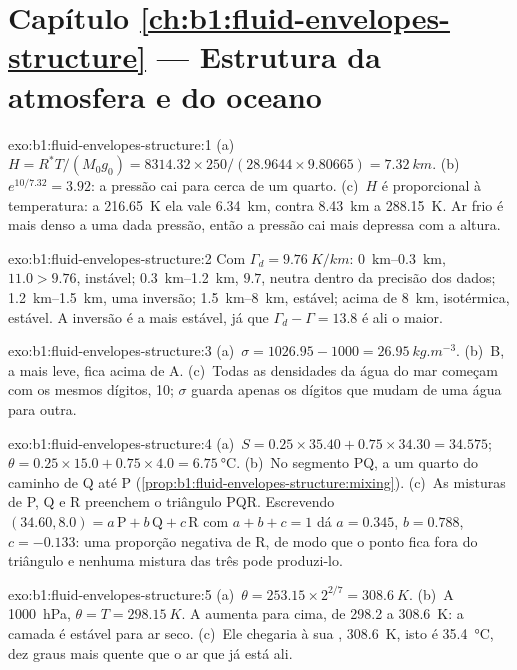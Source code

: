 \section*{Capítulo \ref{ch:b1:fluid-envelopes-structure} --- Estrutura da atmosfera e do oceano}

\begin{solution}{exo:b1:fluid-envelopes-structure:1}
(a)~$H = R^*T/(M_0 g_0) = 8314.32 \times 250/(28.9644 \times 9.80665) =
\qty{7.32}{km}$. (b)~$e^{10/7.32} = 3.92$: a pressão cai para cerca de um quarto.
(c)~$H$ é proporcional à temperatura: a \qty{216.65}{K} ela vale
\qty{6.34}{km}, contra \qty{8.43}{km} a \qty{288.15}{K}. Ar frio é mais denso a uma
dada pressão, então a pressão cai mais depressa com a altura.
\end{solution}

\begin{solution}{exo:b1:fluid-envelopes-structure:2}
Com $\Gamma_d = \qty{9.76}{K/km}$: \qtyrange{0}{0.3}{km}, $11.0 > 9.76$,
instável; \qtyrange{0.3}{1.2}{km}, $9.7$, neutra dentro da precisão dos dados;
\qtyrange{1.2}{1.5}{km}, uma inversão; \qtyrange{1.5}{8}{km}, estável; acima de \qty{8}{km},
isotérmica, estável. A inversão é a mais estável, já que $\Gamma_d - \Gamma = 13.8$ é ali o maior.
\end{solution}

\begin{solution}{exo:b1:fluid-envelopes-structure:3}
(a)~$\sigma = 1026.95 - 1000 = \qty{26.95}{kg.m^{-3}}$. (b)~B, a mais leve, fica acima de A.
(c)~Todas as densidades da água do mar começam com os mesmos dígitos, 10; $\sigma$ guarda apenas
os dígitos que mudam de uma água para outra.
\end{solution}

\begin{solution}{exo:b1:fluid-envelopes-structure:4}
(a)~$S = 0.25 \times 35.40 + 0.75 \times 34.30 = 34.575$; $\theta = 0.25 \times
15.0 + 0.75 \times 4.0 = \qty{6.75}{\celsius}$. (b)~No segmento PQ, a um quarto
do caminho de Q até P (\cref{prop:b1:fluid-envelopes-structure:mixing}).
(c)~As misturas de P, Q e R preenchem o triângulo PQR. Escrevendo
$(34.60, 8.0) = a\,\mathrm P + b\,\mathrm Q + c\,\mathrm R$ com $a + b + c = 1$
dá $a = 0.345$, $b = 0.788$, $c = -0.133$: uma proporção negativa de R, de modo que o
ponto fica fora do triângulo e nenhuma mistura das três pode produzi-lo.
\end{solution}

\begin{solution}{exo:b1:fluid-envelopes-structure:5}
(a)~$\theta = 253.15 \times 2^{2/7} = \qty{308.6}{K}$. (b)~A \qty{1000}{hPa},
$\theta = T = \qty{298.15}{K}$. A  aumenta para cima, de
298.2 a \qty{308.6}{K}: a camada é estável para ar seco. (c)~Ele chegaria à
sua , \qty{308.6}{K}, isto é \qty{35.4}{\celsius}, dez
graus mais quente que o ar que já está ali.
\end{solution}

